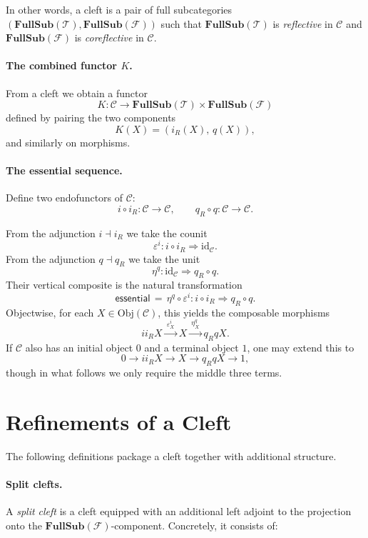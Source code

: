 \documentclass[11pt]{article}
\newcommand{\Obj}{\mathrm{Obj}}
\newcommand{\id}{\mathrm{id}}
\newcommand{\FS}[1]{\mathbf{FullSub}(#1)} %
\newcommand{\Prod}{\times}
\begin{document}
\medskip
In other words, a cleft is a pair of full subcategories $(\FS{\mathcal{T}},\FS{\mathcal{F}})$ such that
$\FS{\mathcal{T}}$ is \emph{reflective} in $\mathcal{C}$ and $\FS{\mathcal{F}}$ is \emph{coreflective} in $\mathcal{C}$.

\paragraph{The combined functor $K$.}
From a cleft we obtain a functor
\[
  K : \mathcal{C} \to \FS{\mathcal{T}} \Prod \FS{\mathcal{F}}
\]
defined by pairing the two components
\[
  K(X) = (i_R(X),\, q(X)),
\]
and similarly on morphisms.

\paragraph{The essential sequence.}
Define two endofunctors of $\mathcal{C}$:
\[
  i \circ i_R : \mathcal{C} \to \mathcal{C},
  \qquad
  q_R \circ q : \mathcal{C} \to \mathcal{C}.
\]

From the adjunction $i \dashv i_R$ we take the counit
\[
  \varepsilon^i : i \circ i_R \Rightarrow \id_{\mathcal{C}}.
\]
From the adjunction $q \dashv q_R$ we take the unit
\[
  \eta^q : \id_{\mathcal{C}} \Rightarrow q_R \circ q.
\]
Their vertical composite is the natural transformation
\[
  \mathsf{essential} \,=\, \eta^q \circ \varepsilon^i : i \circ i_R \Rightarrow q_R \circ q.
\]
Objectwise, for each $X \in \Obj(\mathcal{C})$, this yields the composable morphisms
\[
  i i_R X \xrightarrow{\ \varepsilon^i_X\ } X \xrightarrow{\ \eta^q_X\ } q_R q X.
\]
If $\mathcal{C}$ also has an initial object $0$ and a terminal object $1$, one may extend this to
\[
  0 \to i i_R X \to X \to q_R q X \to 1,
\]
though in what follows we only require the middle three terms.

\section*{Refinements of a Cleft}

The following definitions package a cleft together with additional structure.

\paragraph{Split clefts.}
A \emph{split cleft} is a cleft equipped with an additional left adjoint to the projection onto the
$\FS{\mathcal{F}}$-component.
Concretely, it consists of:
\end{document}
